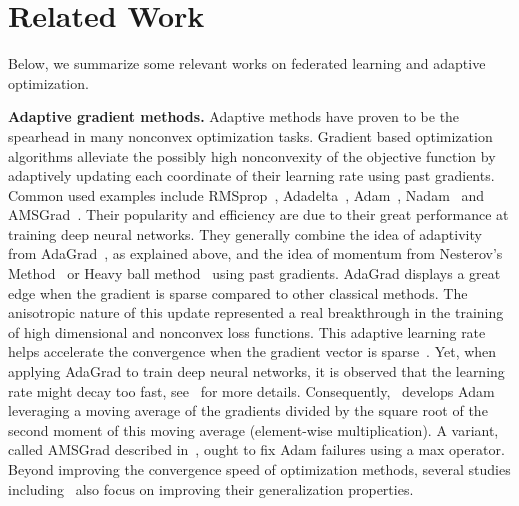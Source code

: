 \documentclass[nohyperref]{article}
\begin{document}
\section{Related Work}\label{sec:related}

Below, we summarize some relevant works on federated learning and adaptive optimization.

\vspace{0.1in}
\noindent\textbf{Adaptive gradient methods.}
Adaptive methods have proven to be the spearhead in many nonconvex optimization tasks.
Gradient based optimization algorithms alleviate the possibly high nonconvexity of the objective function by adaptively updating each coordinate of their learning rate using past gradients. 
Common used examples include RMSprop~\citep{TH12}, Adadelta~\citep{Z12}, Adam~\citep{KB15}, Nadam~\citep{dozat2016incorporating} and AMSGrad~\citep{reddi2019convergence}.
Their popularity and efficiency are due to their great performance at training deep neural networks.
They generally combine the idea of adaptivity from AdaGrad~\citep{DHS11,mcmahan2010adaptive}, as explained above, and the idea of momentum from Nesterov's Method~\citep{N04} or Heavy ball method~\citep{P64} using past gradients.
AdaGrad displays a great edge when the gradient is sparse compared to other classical methods.
The anisotropic nature of this update represented a real breakthrough in the training of high dimensional and nonconvex loss functions.
This adaptive learning rate helps accelerate the convergence when the gradient vector is sparse~\citep{DHS11}. Yet, when applying AdaGrad to train deep neural networks, it is observed that the learning rate might decay too fast, see~\citet{KB15} for more details.
Consequently,~\cite{KB15} develops Adam leveraging a moving average of the gradients divided by the square root of the second moment of this moving average (element-wise multiplication).
A variant, called AMSGrad described in~\citet{reddi2019convergence}, ought to fix Adam failures using a max operator. Beyond improving the convergence speed of optimization methods, several studies including~\citet{zhou2020towards} also focus on improving their generalization properties.
\end{document}
